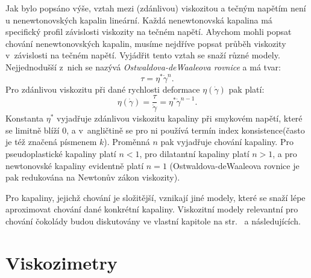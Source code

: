 \documentclass[12pt]{article}
\begin{document}
Jak bylo popsáno výše, vztah mezi (zdánlivou) viskozitou a tečným napětím není u nenewtonovských kapalin lineární. Každá nenewtonovská kapalina má specifický profil závislosti viskozity na tečném napětí. Abychom mohli popsat chování nenewtonovských kapalin, musíme nejdříve popsat průběh viskozity v~závislosti na tečném napětí. Vyjádřit tento vztah se snaží různé modely. Nejjednodušší z~nich se nazývá \emph{Ostwaldova-deWaaleova rovnice} a má tvar:~\cite{online:Skripta_viskozni_latky}\cite{wiki:Power-law_fluid}
\begin{equation}
    \tau = \eta^{*}\dot\gamma^n\text{.}
    \label{eq:ostwald_dewaale}
\end{equation}
Pro zdánlivou viskozitu při dané rychlosti deformace $\eta(\dot\gamma)$ pak platí:
\begin{equation}
    \eta(\dot\gamma) = \frac{\tau}{\dot\gamma} = \eta^*\dot\gamma^{n-1}\text{.}
\end{equation}
Konstanta $\eta^*$ vyjadřuje zdánlivou viskozitu kapaliny při smykovém napětí, které se limitně blíží $0$, a v~angličtině se pro ni používá termín \glqq index konsistence\grqq\space(často je též značená písmenem $k$). Proměnná $n$ pak vyjadřuje chování kapaliny. Pro pseudoplastické kapaliny platí $n < 1$, pro dilatantní kapaliny platí $n > 1$, a pro newtonovské kapaliny evidentně platí $n = 1$ (Ostwaldova-deWaaleova rovnice je pak redukována na Newtonův zákon viskozity).
\par
Pro kapaliny, jejichž chování je složitější, vznikají jiné modely, které se snaží lépe aproximovat chování dané konkrétní kapaliny. Viskozitní modely relevantní pro chování čokolády budou diskutovány ve vlastní kapitole na str.~\pageref{sec:Reologické_vlastnosti_čokolády} a následujících.

\newpage%
\section{Viskozimetry}%
\end{document}
